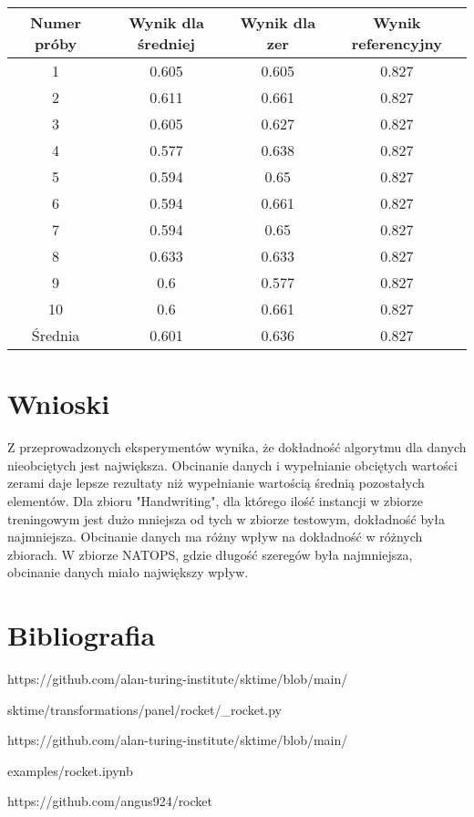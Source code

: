 \documentclass[12pt]{article}
\begin{document}
\begin{center}
\begin{tabular}{|c c c c|} 
 \hline
 Numer próby & Wynik dla średniej & Wynik dla zer & Wynik referencyjny \\ [0.5ex] 
 \hline\hline
 1 & 0.605 & 0.605 & 0.827 \\
 \hline
 2 & 0.611 & 0.661 & 0.827 \\
 \hline
 3 & 0.605 & 0.627 & 0.827 \\
 \hline
 4 & 0.577 & 0.638 & 0.827 \\
 \hline
  5 & 0.594 & 0.65 & 0.827 \\
 \hline
  6 & 0.594 & 0.661 & 0.827 \\
 \hline
  7 & 0.594 & 0.65 & 0.827 \\
 \hline
  8 & 0.633 & 0.633 & 0.827 \\
 \hline
  9 & 0.6 & 0.577 & 0.827 \\
 \hline
  10 & 0.6 & 0.661 & 0.827 \\
 \hline
 Średnia & 0.601 & 0.636 & 0.827 \\
 \hline
\end{tabular}
\end{center}

\section{Wnioski}

Z przeprowadzonych eksperymentów wynika, że dokładność algorytmu dla danych nieobciętych jest największa. Obcinanie danych i wypełnianie obciętych wartości zerami daje lepsze rezultaty niż wypełnianie wartością średnią pozostałych elementów. Dla zbioru "Handwriting", dla którego ilość instancji w zbiorze treningowym jest dużo mniejsza od tych w zbiorze testowym, dokładność była najmniejsza. Obcinanie danych ma różny wpływ na dokładność w różnych zbiorach. W zbiorze NATOPS, gdzie długość szeregów była najmniejsza, obcinanie danych miało największy wpływ.

\section{Bibliografia}

\begingroup
\renewcommand{\section}[2]{}%
\begin{thebibliography}{9}

https://github.com/alan-turing-institute/sktime/blob/main/

sktime/transformations/panel/rocket/\_rocket.py

https://github.com/alan-turing-institute/sktime/blob/main/

examples/rocket.ipynb

https://github.com/angus924/rocket
\end{thebibliography}
\endgroup
\end{document}
